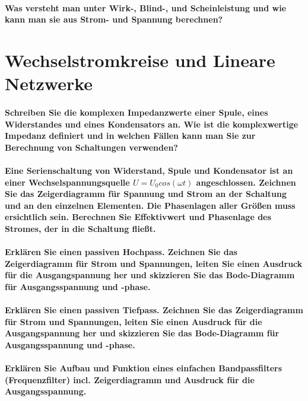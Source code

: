 \documentclass[a4paper, 11pt, parskip=half]{scrartcl}
\begin{document}
\paragraph{Was versteht man unter Wirk-, Blind-, und Scheinleistung und wie kann man sie aus Strom-
und Spannung berechnen?}

\newpage

\section{Wechselstromkreise und Lineare Netzwerke}

\paragraph{Schreiben Sie die komplexen Impedanzwerte einer Spule, eines Widerstandes und eines
Kondensators an. Wie ist die komplexwertige Impedanz definiert und in welchen Fällen kann man Sie
zur Berechnung von Schaltungen verwenden?}

\paragraph{Eine Serienschaltung von Widerstand, Spule und Kondensator ist an einer
Wechselspannungsquelle $U=U_0 cos (\omega t)$ angeschlossen. Zeichnen Sie das Zeigerdiagramm für
Spannung und Strom an der Schaltung und an den einzelnen Elementen. Die Phasenlagen aller Größen
muss ersichtlich sein. Berechnen Sie Effektivwert und Phasenlage des Stromes, der in die Schaltung
fließt.}

\paragraph{Erklären Sie einen passiven Hochpass. Zeichnen Sie das Zeigerdiagramm für Strom und
Spannungen, leiten Sie einen Ausdruck für die Ausgangspannung her und skizzieren Sie das
Bode-Diagramm für Ausgangsspannung und -phase.}

\paragraph{Erklären Sie einen passiven Tiefpass. Zeichnen Sie das Zeigerdiagramm für Strom und
Spannungen, leiten Sie einen Ausdruck für die Ausgangspannung her und skizzieren Sie das
Bode-Diagramm für Ausgangsspannung und -phase.}

\paragraph{Erklären Sie Aufbau und Funktion eines einfachen Bandpassfilters (Frequenzfilter) incl.
Zeigerdiagramm und Ausdruck für die Ausgangsspannung.}
\end{document}
